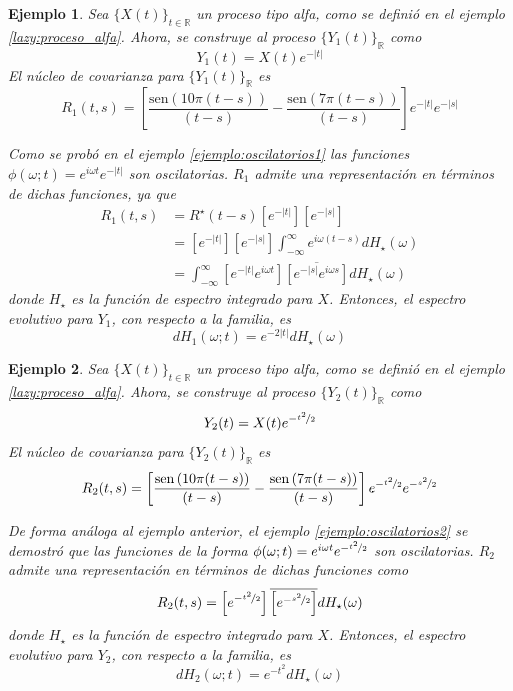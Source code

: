 \documentclass[12pt,letterpaper]{book}
\newtheorem{ejemplo}{Ejemplo}[chapter]
\newcommand{\R}{\mathbb{R}}
\newcommand{\intR}{\int_{-\infty}^{\infty}}
\newcommand{\SEN}[1]{\mathrm{sen}\left( #1 \right)}
\newcommand{\abso}[1]{\left| #1 \right|}
\newcommand{\xtin}[1]{$\{X(t)\}_{t\in \mathcal{ #1 }}$ }
\begin{document}
\begin{ejemplo}
Sea \xtin{\R} un proceso tipo alfa, como se definió en el ejemplo \ref{lazy:proceso_alfa}. 
%
Ahora, se construye al proceso $\{Y_1(t)\}_{\R}$ como
\begin{equation}
Y_1(t) = X(t) e^{-\abso{t}}
\end{equation}
%
El núcleo de covarianza para $\{Y_1(t)\}_{\R}$ es
\begin{equation}
R_1(t,s) = \left[ \frac{\SEN{10 \pi (t-s)}}{(t-s)} - \frac{\SEN{7 \pi (t-s)}}{(t-s)} \right] e^{-\abso{t} } e^{-\abso{s}}
\end{equation}

Como se probó en el ejemplo \ref{ejemplo:oscilatorios1} las funciones $\phi(\omega; t) = e^{i \omega t} e^{-\abso{t}}$ son oscilatorias. $R_1$ admite una representación en términos de dichas funciones, ya que
\begin{align*}
R_1(t,s) &= R^\star(t-s) \left[e^{-\abso{t}}\right] \left[ e^{-\abso{s}} \right] \\
&= \left[e^{-\abso{t}}\right] \left[ e^{-\abso{s}} \right] \intR e^{i \omega (t-s)} dH_\star(\omega) \\
&= \intR \left[e^{-\abso{t}} e^{i \omega t} \right] \overline{\left[ e^{-\abso{s}} e^{i \omega s} \right]}  dH_\star(\omega)
\end{align*}
donde $H_\star$ es la función de espectro integrado para $X$. Entonces, el espectro evolutivo para $Y_1$, con respecto a la familia, es
\begin{equation}
dH_1(\omega;t) = e^{- 2 \abso{t}} dH_\star(\omega)
\end{equation}
\label{ejemplo:lazy1}
\end{ejemplo}

\begin{ejemplo}
Sea \xtin{\R} un proceso tipo alfa, como se definió en el ejemplo \ref{lazy:proceso_alfa}. 
%
Ahora, se construye al proceso $\{Y_2(t)\}_{\R}$ como
\begin{equation}
Y_2(t) = X(t) e^{-\nicefrac{t^2}{2}}
\end{equation}
%
El núcleo de covarianza para $\{Y_2(t)\}_{\R}$ es
\begin{equation}
R_2(t,s) = \left[ \frac{\SEN{10 \pi (t-s)}}{(t-s)} - \frac{\SEN{7 \pi (t-s)}}{(t-s)} \right] e^{-\nicefrac{t^2}{2}} e^{-\nicefrac{s^2}{2}}
\end{equation}

De forma análoga al ejemplo anterior, el ejemplo \ref{ejemplo:oscilatorios2} se demostró que las funciones de la forma $\phi(\omega; t) = e^{i \omega t} e^{-\nicefrac{t^2}{2}}$ son oscilatorias. $R_2$ admite una representación en términos de dichas funciones como
\begin{equation}
R_2(t,s) = \left[e^{-\nicefrac{t^2}{2}} \right] \overline{\left[ e^{-\nicefrac{s^2}{2}} \right]}  dH_\star(\omega)
\end{equation}
donde $H_\star$ es la función de espectro integrado para $X$. Entonces, el espectro evolutivo para $Y_2$, con respecto a la familia, es
\begin{equation}
dH_2(\omega;t) = e^{-{t^2}} dH_\star(\omega)
\end{equation}
\label{ejemplo:lazy2}
\end{ejemplo}
\end{document}
